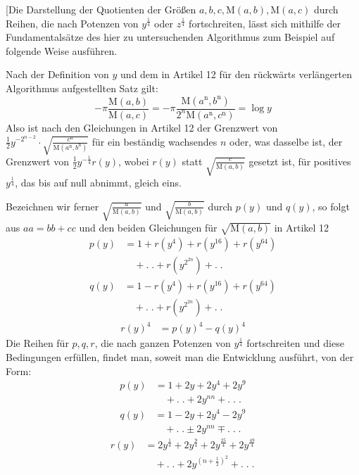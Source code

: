 [Die Darstellung der Quotienten der Größen $a,b,c,\mathrm M(a,b),\mathrm M(a,c)$ durch Reihen, die nach Potenzen von $y^{\frac14}$ oder $z^{\frac14}$ fortschreiten, lässt sich mithilfe der Fundamentalsätze des hier zu untersuchenden Algorithmus zum Beispiel auf folgende Weise ausführen.

Nach der Definition von $y$ und dem in Artikel 12 für den rückwärts verlängerten Algorithmus aufgestellten Satz gilt:
\[
-\pi\frac{\mathrm M(a,b)}{\mathrm M(a,c)}
=-\pi\frac{\mathrm M(a^{\mathrm n},b^{\mathrm n})}{2^n\mathrm M(a^{\mathrm n},c^{\mathrm n})}=\log y
\]
Also ist nach den Gleichungen in Artikel 12 der Grenzwert von\hfill\\{}
$\frac12y^{-2^{n-2}}\cdot\surd{\frac{c^{\mathrm n}}{\mathrm M(a^{\mathrm n},b^{\mathrm n})}}$ für ein beständig wachsendes $n$ oder, was dasselbe ist, der Grenzwert von $\frac12y^{-\frac14}r(y)$,
wobei $r(y)$ statt $\surd{\frac{c}{\mathrm M(a,b)}}$ gesetzt ist, für positives $y^{\frac14}$, das bis auf null abnimmt, gleich eins.

Bezeichnen wir ferner $\surd{\frac{a}{\mathrm M(a,b)}}$ und $\surd{\frac{b}{\mathrm M(a,b)}}$ durch $p(y)$ und $q(y)$, so folgt aus
$aa=bb+cc$ und den beiden Gleichungen für $\surd{\mathrm M(a,b)}$ in Artikel 12
\[
\begin{aligned}p(y)&=1+r(y^4)+r(y^{16})+r(y^{64})\\&\quad+.\;.+r(y^{2^{2n}})+.\;.\end{aligned}
\]
\[
\begin{aligned}q(y)&=1-r(y^4)+r(y^{16})+r(y^{64})\\&\quad+.\;.+r(y^{2^{2n}})+.\;.\end{aligned}
\]
\[
\begin{aligned}r(y)^4&=p(y)^4-q(y)^4\end{aligned}
\]
Die Reihen für $p,q,r$, die nach ganzen Potenzen von $y^{\frac14}$ fortschreiten und diese Bedingungen erfüllen, findet man, soweit man die Entwicklung ausführt, von der Form:
\[
\begin{aligned}p(y)&=1+2y+2y^4+2y^9\\&\quad+.\;.+2y^{nn}+.\;.\;.\end{aligned}
\]
\[
\begin{aligned}q(y)&=1-2y+2y^4-2y^9\\&\quad+.\;.\pm2y^{nn}\mp.\;.\;.\end{aligned}
\]
\[
\begin{aligned}r(y)&=2y^{\frac14}+2y^{\frac94}+2y^{\frac{25}4}+2y^{\frac{49}4}\\&\quad+.\;.+2y^{(n+\frac12)^2}+.\;.\;.\end{aligned}
\]

